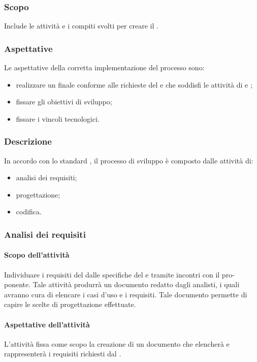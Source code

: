 \subsubsection{Scopo}
Include le attività e i compiti svolti per creare il .
\subsubsection{Aspettative}
Le aspettative della corretta implementazione del processo sono:
\begin{itemize}
		\item realizzare un  finale conforme alle richieste del  e che soddisfi le attività di  e ;
		\item fissare gli obiettivi di sviluppo;
		\item fissare i vincoli tecnologici.
\end{itemize}

\subsubsection{Descrizione}
In accordo con lo standard , il processo di sviluppo è composto dalle attività di:
\begin{itemize}
		\item analisi dei requisiti;
		\item progettazione;
		\item codifica.
\end{itemize}

\subsubsection{Analisi dei requisiti}
 \paragraph{Scopo dell'attività}
  Individuare i requisiti del  dalle specifiche del  e tramite incontri con il pro-
  ponente. Tale attività produrrà un documento redatto dagli analisti, i quali avranno cura di elencare i casi d'uso e i requisiti. Tale documento permette di
 capire le scelte di progettazione effettuate.
 \paragraph{Aspettative dell'attività}
 L'attività fissa come scopo la creazione di un documento che elencherà e rappresenterà i requisiti richiesti dal .
